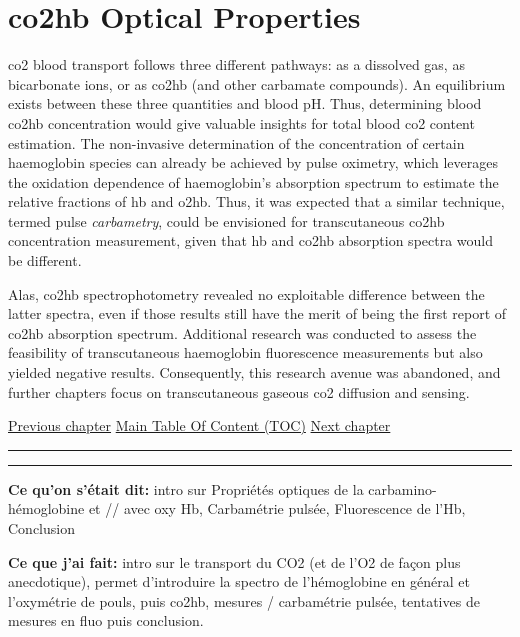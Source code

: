 \chapter{\texorpdfstring{\gls{co2hb}}{Carbamino-Haemoglobin (CO2Hb)} Optical Properties}\label{chap:co2hb}

\begin{tldrbox}
	
	\gls{co2} blood transport follows three different pathways: as a dissolved gas, as bicarbonate ions, or as \gls{co2hb} (and other carbamate compounds). An equilibrium exists between these three quantities and blood pH. Thus, determining blood \gls{co2hb} concentration would give valuable insights for total blood \gls{co2} content estimation. The non-invasive determination of the concentration of certain haemoglobin species can already be achieved by pulse oximetry, which leverages the oxidation dependence of haemoglobin's absorption spectrum to estimate the relative fractions of \gls{hb} and \gls{o2hb}. Thus, it was expected that a similar technique, termed pulse \emph{carbametry}, could be envisioned for transcutaneous \gls{co2hb} concentration measurement, given that \gls{hb} and \gls{co2hb} absorption spectra would be different.
	
	Alas, \gls{co2hb} spectrophotometry revealed no exploitable difference between the latter spectra, even if those results still have the merit of being the first report of \gls{co2hb} absorption spectrum. Additional research was conducted to assess the feasibility of transcutaneous haemoglobin fluorescence measurements but also yielded negative results. Consequently, this research avenue was abandoned, and further chapters focus on transcutaneous gaseous \gls{co2} diffusion and sensing.
	
	\tcblower
	
	\hyperref[chap:intro]{Previous chapter} \hfill \hyperref[chapter:toc]{Main Table Of Content (TOC)} \hfill \hyperref[chap:tcco2]{Next chapter}
	
\end{tldrbox}

\vspace{.3cm}\hrule\vspace{.1cm}\hrule\vspace{.3cm}

\textbf{Ce qu'on s'était dit:} intro sur Propriétés optiques de la carbamino-hémoglobine et // avec oxy Hb, Carbamétrie pulsée, Fluorescence de l’Hb, Conclusion

\textbf{Ce que j'ai fait:} intro sur le transport du CO2 (et de l'O2 de façon plus anecdotique), permet d'introduire la spectro de l'hémoglobine en général et l'oxymétrie de pouls, puis co2hb, mesures / carbamétrie pulsée, tentatives de mesures en fluo puis conclusion.

